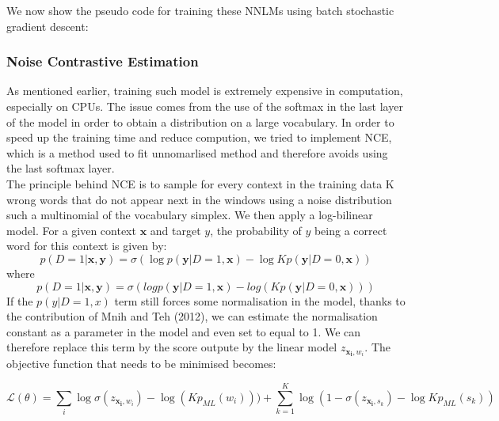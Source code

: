 \documentclass[11pt]{article}
\begin{document}
We now show the pseudo code for training these NNLMs using batch stochastic gradient descent:
  \begin{algorithmic}[1]
    \EndFor{}
    \EndFor{}
    
    \EndFor{}
    \EndProcedure{}
  \end{algorithmic}


\subsubsection{Noise Contrastive Estimation}

As mentioned earlier, training such model is extremely expensive in computation, especially on CPUs. The issue comes from the use of the softmax in the last layer of the model in order to obtain a distribution on a large vocabulary. In order to speed up the training time and reduce compution, we tried to implement NCE, which is a method used to fit unnomarlised method and therefore avoids using the last softmax layer.\\

\noindent The principle behind NCE is to sample for every context in the training data K wrong words that do not appear next in the windows using a noise distribution such a multinomial of the vocabulary simplex. We then apply a log-bilinear model. For a given context $\boldsymbol{x}$ and target $y$, the probability of $y$ being a correct word for this context is given by:
$$p(D = 1 | \boldsymbol{x,y}) =  \sigma(\log p(\boldsymbol{y}|D = 1,\boldsymbol{x})-\log Kp(\boldsymbol{y} | D = 0, \boldsymbol{x}))$$
where $$p(D = 1|\boldsymbol{x}, \boldsymbol{y}) = \sigma(log p(\boldsymbol{y}|D = 1, \boldsymbol{x}) - log(Kp(\boldsymbol{y}|D = 0, \boldsymbol{x})))
$$
If the $p(y|D = 1, x)$ term still forces some normalisation in the model, thanks to the contribution of Mnih and Teh (2012), we can estimate the normalisation constant as a parameter in the model and even set to equal to 1. We can therefore replace this term by the score outpute by the linear model $z_{\boldsymbol{x_i},w_i}$. The objective function that needs to be minimised becomes:

$$\mathcal{L}(\theta) = \sum\limits_{i} \log \sigma(z_{\boldsymbol{x_i},w_i}) - \log(K p_{ML}(w_i))) + \sum\limits_{k=1}^{K} \log(1-\sigma(z_{\boldsymbol{x_i},s_k}) - \log K p_{ML}(s_k)) $$
\end{document}
